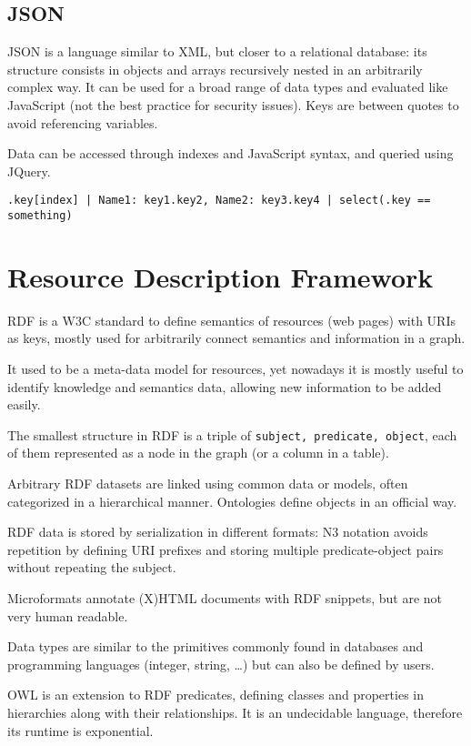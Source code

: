 \subsection{JSON}
JSON is a language similar to XML, but closer to a relational database: its structure consists in objects and arrays recursively nested in an arbitrarily complex way. It can be used for a broad range of data types and evaluated like JavaScript (not the best practice for security issues). Keys are between quotes to avoid referencing variables. 

Data can be accessed through indexes and JavaScript syntax, and queried using JQuery. 

\texttt{.key[index] | {Name1: key1.key2, Name2: key3.key4} | select(.key == something)}

\section{Resource Description Framework}
RDF is a W3C standard to define semantics of resources (web pages) with URIs as keys, mostly used for arbitrarily connect semantics and information in a graph. 

It used to be a meta-data model for resources, yet nowadays it is mostly useful to identify knowledge and semantics data, allowing new information to be added easily.

The smallest structure in RDF is a triple of \texttt{subject, predicate, object}, each of them represented as a node in the graph (or a column in a table). 

Arbitrary RDF datasets are linked using common data or models, often categorized in a hierarchical manner. Ontologies define objects in an official way.

RDF data is stored by serialization in different formats: N3 notation avoids repetition by defining URI prefixes and storing multiple predicate-object pairs without repeating the subject.

Microformats annotate (X)HTML documents with RDF snippets, but are not very human readable. 

Data types are similar to the primitives commonly found in databases and programming languages (integer, string, \dots) but can also be defined by users. 

OWL is an extension to RDF predicates, defining classes and properties in hierarchies along with their relationships. It is an undecidable language, therefore its runtime is exponential.


